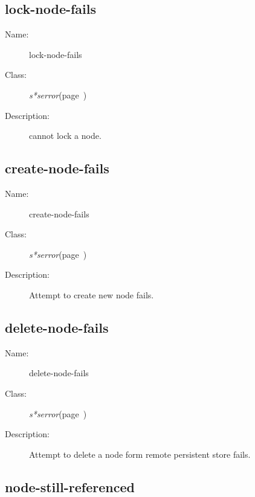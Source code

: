 \subsection{lock-node-fails}
\label{lock-node-fails}

\begin{description}

\item [Name:]  lock-node-fails


\item [Class:]
{\sl s*serror}\hfill(page~\pageref{s*serror})


\item [Description:]
cannot lock a node.


\end{description}
\horizontalline

\subsection{create-node-fails}
\label{create-node-fails}

\begin{description}
\item [Name:]  create-node-fails


\item [Class:]
{\sl s*serror}\hfill(page~\pageref{s*serror})


\item [Description:]
Attempt to create new node fails.

\end{description}
\horizontalline

\subsection{delete-node-fails}
\label{delete-node-fails}

\begin{description}
\item [Name:]  delete-node-fails


\item [Class:]
{\sl s*serror}\hfill(page~\pageref{s*serror})


\item [Description:]
Attempt to delete a node form remote persistent store fails.


\end{description}
\horizontalline

\subsection{node-still-referenced}
\label{node-still-referenced}

